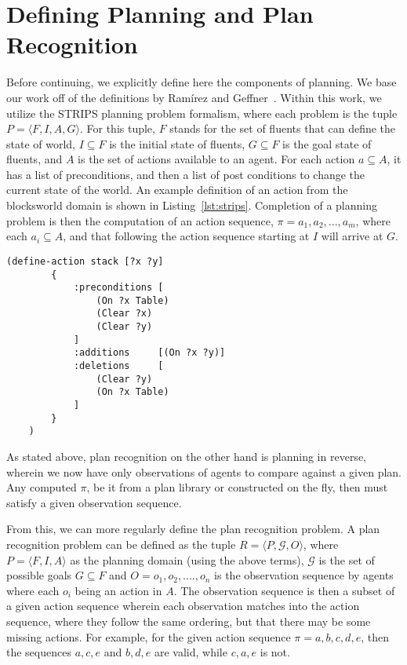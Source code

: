 \section{Defining Planning and Plan Recognition}

Before continuing, we explicitly define here the components of planning. We base our
work off of the definitions by Ramírez and Geffner~\cite{ramirez_plan_2009}.
Within this work, we utilize the STRIPS planning problem formalism, where each problem is the
tuple $P = \langle F, I, A, G \rangle$. For this tuple, $F$ stands for the set of
fluents that can define the state of world, $I \subseteq F$ is the initial state of
fluents, $G \subseteq F$ is the goal state of fluents, and $A$ is the set of actions
available to an agent. For each action $a \subseteq A$, it has a list
of preconditions, and then a list of post conditions to change the current
state of the world. An example definition of an action from the blocksworld domain is shown
in Listing~\ref{lst:strips}. Completion of a planning problem is then the computation of
an action sequence, $\pi = a_{1}, a_{2}, ..., a_{m}$, where each
$a_{i} \subseteq A$, and that following the action sequence starting at $I$
will arrive at $G$.

\begin{lstlisting}[caption=Stack action defined in STRIPS style,label={lst:strips}]
    (define-action stack [?x ?y]
        {
            :preconditions [
                (On ?x Table)
                (Clear ?x)
                (Clear ?y)
            ]
            :additions     [(On ?x ?y)]
            :deletions     [
                (Clear ?y)
                (On ?x Table)
            ]
        }
    )
\end{lstlisting}

As stated above, plan recognition on the other hand is planning in reverse,
wherein we now have only observations of agents to compare against a given plan.
Any computed $\pi$, be it from a plan library or constructed on the fly, then
must satisfy a given observation sequence.

From this, we can more regularly define the plan recognition problem. A plan recognition
problem can be defined as the tuple $R = \langle P, \mathcal{G}, O \rangle$, where
$P = \langle F, I, A \rangle$ as the planning domain (using the above terms),
$\mathcal{G}$ is the set of possible goals $G \subseteq F$ and
$O = o_{1}, o_{2}, ...., o_{n}$ is the observation sequence by agents where each
$o_{i}$ being an action in $A$. The observation sequence is then a subset
of a given action sequence wherein each observation matches into the action
sequence, where they follow the same ordering, but that there may be some missing
actions. For example, for the given action sequence $\pi = {a,b,c,d,e}$, then
the sequences ${a,c,e}$ and ${b,d,e}$ are valid, while ${c,a,e}$ is not.
